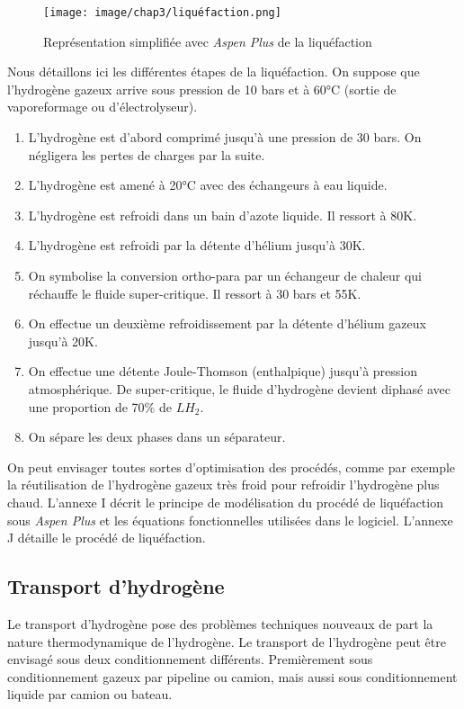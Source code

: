\documentclass[11pt,french,a4paper]{article}
\begin{document}
\begin{figure}[h!]
\centering
\texttt{[image: image/chap3/liquéfaction.png]}
\caption{Représentation simplifiée avec \textit{Aspen Plus} de la liquéfaction}
\end{figure}

Nous détaillons ici les différentes étapes de la liquéfaction. On suppose que l'hydrogène gazeux arrive sous pression de 10 bars et à 60°C (sortie de vaporeformage ou d'électrolyseur).
\begin{enumerate}
\item L'hydrogène est d'abord comprimé jusqu'à une pression de 30 bars. On négligera les pertes de charges par la suite.
\item L'hydrogène est amené à 20°C avec des échangeurs à eau liquide.
\item L'hydrogène est refroidi dans un bain d'azote liquide. Il ressort à 80K.
\item L'hydrogène est refroidi par la détente d'hélium jusqu'à 30K.
\item On symbolise la conversion ortho-para par un échangeur de chaleur qui réchauffe le fluide super-critique. Il ressort à 30 bars et 55K.
\item On effectue un deuxième refroidissement par la détente d'hélium gazeux jusqu'à 20K.
\item On effectue une détente Joule-Thomson (enthalpique) jusqu'à pression atmosphérique. De super-critique, le fluide d'hydrogène devient diphasé avec une proportion de 70\% de $LH_2$.
\item On sépare les deux phases dans un séparateur.
\end{enumerate}

On peut envisager toutes sortes d'optimisation des procédés, comme par exemple la réutilisation de l'hydrogène gazeux très froid pour refroidir l'hydrogène plus chaud. L'annexe I décrit le principe de modélisation du procédé de liquéfaction sous \textit{Aspen Plus} et les équations fonctionnelles utilisées dans le logiciel.
L'annexe J détaille le procédé de liquéfaction.

\subsection{Transport d'hydrogène}
Le transport d'hydrogène pose des problèmes techniques nouveaux de part la nature thermodynamique de l'hydrogène. Le transport de l’hydrogène peut être envisagé sous deux conditionnement différents. Premièrement sous conditionnement gazeux par pipeline ou camion, mais aussi sous conditionnement liquide par camion ou bateau.
\end{document}
